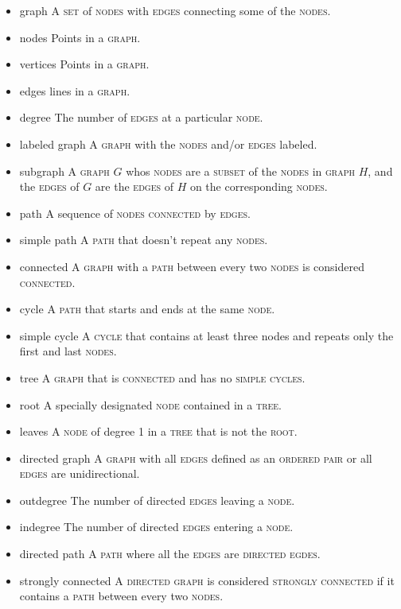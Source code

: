\documentclass{article}
\newcommand{\term}[1]{\textsc{#1}}
\begin{document}
\bigskip \indent
\begin{itemize}
\item graph
  \subitem A \term{set} of \term{nodes} with \term{edges} connecting some of the \term{nodes}.
\item nodes
  \subitem Points in a \term{graph}.
\item vertices
  \subitem Points in a \term{graph}.
\item edges
  \subitem lines in a \term{graph}.
\item degree
  \subitem The number of \term{edges} at a particular \term{node}.
\item labeled graph
  \subitem A \term{graph} with the \term{nodes} and/or \term{edges} labeled.
\item subgraph
  \subitem A \term{graph} $G$ whos \term{nodes} are a \term{subset} of the \term{nodes} in \term{graph} $H$, and the \term{edges} of $G$ are the \term{edges} of $H$ on the corresponding \term{nodes}.
\item path
  \subitem A sequence of \term{nodes} \term{connected} by \term{edges}.
\item simple path
  \subitem A \term{path} that doesn't repeat any \term{nodes}.
\item connected
  \subitem A \term{graph} with a \term{path} between every two \term{nodes} is considered \term{connected}.
\item cycle
  \subitem A \term{path} that starts and ends at the same \term{node}.
\item simple cycle
  \subitem A \term{cycle} that contains at least three nodes and repeats only the first and last \term{nodes}.
\item tree
  \subitem A \term{graph} that is \term{connected} and has no \term{simple cycles}.
\item root
  \subitem A specially designated \term{node} contained in a \term{tree}.
\item leaves
  \subitem A \term{node} of degree 1 in a \term{tree} that is not the \term{root}.
\item directed graph
  \subitem A \term{graph} with all \term{edges} defined as an \term{ordered pair} or all \term{edges} are unidirectional.
\item outdegree
  \subitem The number of directed \term{edges} leaving a \term{node}.
\item indegree
  \subitem The number of directed \term{edges} entering a \term{node}.
\item directed path
  \subitem A \term{path} where all the \term{edges} are \term{directed egdes}.
\item strongly connected
  \subitem A \term{directed graph} is considered \term{strongly connected} if it contains a \term{path} between every two \term{nodes}.
\end{itemize}
   
\end{document}
